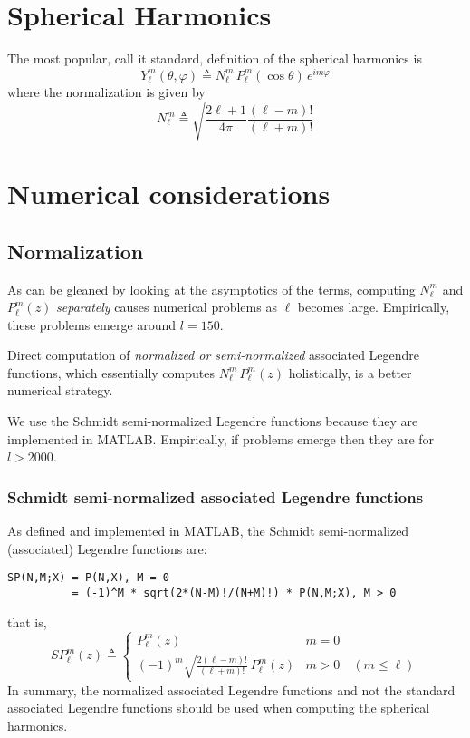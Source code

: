 \documentclass[a4paper,10pt]{article}
\newcommand{\dfn}{\triangleq}
\begin{document}
\section{Spherical Harmonics}

The most popular, call it standard, definition of the spherical harmonics is
\[
	Y_{\ell}^{m}(\theta,\varphi)\dfn
		N_{\ell}^{m}\,
		P_{\ell}^{m}(\cos\theta)\,
		e^{i m\varphi}
\]
where the normalization is given by
\[
	N_{\ell}^{m}\dfn\sqrt{\frac{2\ell+1}{4\pi}\frac{(\ell-m)!}{(\ell+m)!}}
\]

\section{Numerical considerations}

\subsection{Normalization}

As can be gleaned by looking at the asymptotics of the terms, computing $N_{\ell}^{m}$ and $P_{\ell}^{m}(z)$ \emph{separately} causes numerical problems as $\ell$ becomes large. Empirically, these problems emerge around $l=150$.

Direct computation of \emph{normalized or semi-normalized} associated Legendre functions, which essentially computes $N_{\ell}^{m}\,P_{\ell}^{m}(z)$ holistically, is a better numerical strategy.

We use the Schmidt semi-normalized Legendre functions because they are implemented in MATLAB. Empirically, if problems emerge then they are for $l>2000$.

\subsubsection{Schmidt semi-normalized associated Legendre functions}

As defined and implemented in MATLAB, the Schmidt semi-normalized (associated) Legendre functions are:
\color{blue}\begin{verbatim}
SP(N,M;X) = P(N,X), M = 0
          = (-1)^M * sqrt(2*(N-M)!/(N+M)!) * P(N,M;X), M > 0
\end{verbatim}\color{black}
that is,
\[
	S\!P_{\ell}^{m}(z)\dfn
		\begin{cases}
			\displaystyle
			P_{\ell}^{m}(z) &m=0 \\
			\displaystyle
			(-1)^{m}\sqrt{\frac{2(\ell-m)!}{(\ell+m)!}}\,
			P_{\ell}^{m}(z) &m>0\quad (m\leq\ell)
		\end{cases}
\]
In summary, the normalized associated Legendre functions and not the standard associated Legendre functions should be used when computing the spherical harmonics.
\end{document}
